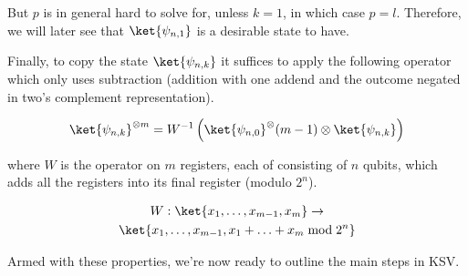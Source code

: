 But $p$ is in general hard to solve for, unless $k=1$, in which case
$p = l$. Therefore, we will later see that $\ket{\psi_{n,1}}$ is a desirable
state to have.

Finally, to copy the state $\ket{\psi_{n,k}}$ it suffices to apply the following
operator which only uses subtraction (addition with one addend and the
outcome negated in two's complement representation).

\begin{equation*}
\ket{\psi_{n,k}}^{\otimes m} = W^{-1}\left( \ket{\psi_{n,0}}^\otimes(m-1) \otimes \ket{\psi_{n,k}} \right)
\end{equation*}

where $W$ is the operator on $m$ registers, each of consisting of $n$ qubits,
which adds all the registers into its final register (modulo $2^n$).

\begin{multline}
W : \ket{x_1,\ldots,x_{m-1},x_m} \rightarrow \\
 \ket{x_1,\ldots,x_{m-1},x_1+\ldots+x_m \bmod 2^n}
\end{multline}

Armed with these properties, we're now ready to outline the main steps in KSV.
